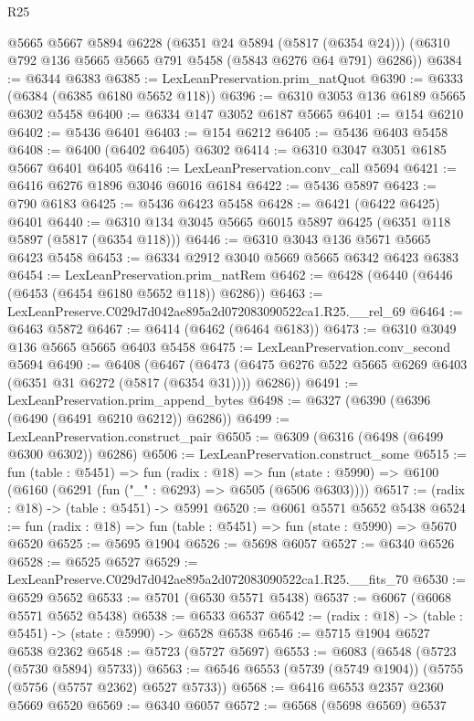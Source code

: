 \begin{lexlean}{R25}
\begin{coremodule}
      @5665
      @5667
      @5894
      @6228
      (@6351 @24 @5894 (@5817 (@6354 @24)))
      (@6310 @792 @136 @5665 @5665 @791 @5458 (@5843 @6276 @64 @791) @6286))
@6384 := @6344 @6383
@6385 := LexLeanPreservation.prim_natQuot
@6390 := @6333 (@6384 (@6385 @6180 @5652 @118))
@6396 := @6310 @3053 @136 @6189 @5665 @6302 @5458
@6400 := @6334 @147 @3052 @6187 @5665
@6401 := @154 @6210
@6402 := @5436 @6401
@6403 := @154 @6212
@6405 := @5436 @6403 @5458
@6408 := @6400 (@6402 @6405) @6302
@6414 := @6310 @3047 @3051 @6185 @5667 @6401 @6405
@6416 := LexLeanPreservation.conv_call @5694
@6421 := @6416 @6276 @1896 @3046 @6016 @6184
@6422 := @5436 @5897
@6423 := @790 @6183
@6425 := @5436 @6423 @5458
@6428 := @6421 (@6422 @6425) @6401
@6440 := @6310 @134 @3045 @5665 @6015 @5897 @6425 (@6351 @118 @5897 (@5817 (@6354 @118)))
@6446 := @6310 @3043 @136 @5671 @5665 @6423 @5458
@6453 := @6334 @2912 @3040 @5669 @5665 @6342 @6423 @6383
@6454 := LexLeanPreservation.prim_natRem
@6462 := @6428 (@6440 (@6446 (@6453 (@6454 @6180 @5652 @118)) @6286))
@6463 := LexLeanPreserve.C029d7d042ae895a2d072083090522ca1.R25.__rel_69
@6464 := @6463 @5872
@6467 := @6414 (@6462 (@6464 @6183))
@6473 := @6310 @3049 @136 @5665 @5665 @6403 @5458
@6475 := LexLeanPreservation.conv_second @5694
@6490 := @6408
    (@6467 (@6473 (@6475 @6276 @522 @5665 @6269 @6403 (@6351 @31 @6272 (@5817 (@6354 @31)))) @6286))
@6491 := LexLeanPreservation.prim_append_bytes
@6498 := @6327 (@6390 (@6396 (@6490 (@6491 @6210 @6212)) @6286))
@6499 := LexLeanPreservation.construct_pair
@6505 := @6309 (@6316 (@6498 (@6499 @6300 @6302)) @6286)
@6506 := LexLeanPreservation.construct_some
@6515 := fun (table : @5451) =>
  fun (radix : @18) =>
  fun (state : @5990) => @6100 (@6160 (@6291 (fun ("_" : @6293) => @6505 (@6506 @6303))))
@6517 := (radix : @18) -> (table : @5451) -> @5991
@6520 := @6061 @5571 @5652 @5438
@6524 := fun (radix : @18) => fun (table : @5451) => fun (state : @5990) => @5670 @6520
@6525 := @5695 @1904
@6526 := @5698 @6057
@6527 := @6340 @6526
@6528 := @6525 @6527
@6529 := LexLeanPreserve.C029d7d042ae895a2d072083090522ca1.R25.__fits_70
@6530 := @6529 @5652
@6533 := @5701 (@6530 @5571 @5438)
@6537 := @6067 (@6068 @5571 @5652 @5438)
@6538 := @6533 @6537
@6542 := (radix : @18) -> (table : @5451) -> (state : @5990) -> @6528 @6538
@6546 := @5715 @1904 @6527 @6538 @2362
@6548 := @5723 (@5727 @5697)
@6553 := @6083 (@6548 (@5723 (@5730 @5894) @5733))
@6563 := @6546 @6553 (@5739 (@5749 @1904)) (@5755 (@5756 (@5757 @2362) @6527 @5733))
@6568 := @6416 @6553 @2357 @2360 @5669 @6520
@6569 := @6340 @6057
@6572 := @6568 (@5698 @6569) @6537

\end{coremodule}
\end{lexlean}
